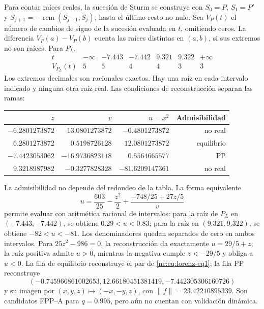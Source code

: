 Para contar raíces reales, la sucesión de Sturm se construye con
\(S_0=P\), \(S_1=P'\) y
\(S_{j+1}=-\operatorname{rem}(S_{j-1},S_j)\), hasta el último resto no
nulo. Sea \(V_P(t)\) el número de cambios de signo de la sucesión evaluada
en \(t\), omitiendo ceros. La diferencia \(V_P(a)-V_P(b)\) cuenta las
raíces distintas en \((a,b)\), si sus extremos no son raíces. Para \(P_L\),
\[
 \begin{array}{c|rrrrrr}
 t&-\infty&-7.443&-7.442&9.321&9.322&+\infty\\\hline
 V_{P_L}(t)&5&5&4&4&3&3
 \end{array}
\]
Los extremos decimales son racionales exactos. Hay una raíz en cada
intervalo indicado y ninguna otra raíz real. Las condiciones de
reconstrucción separan las ramas:
\begin{center}
\begin{tabular}{@{}rrrr@{}}
\toprule
\(z\) & \(v\) & \(u=x^2\) & Admisibilidad\\\midrule
\(-6.2801273872\) & \(13.0801273872\) & \(-0.4801273872\) & no real\\
\(6.2801273872\) & \(0.5198726128\) & \(12.0801273872\) & equilibrio\\
\(-7.4423053062\) & \(-16.9736823118\) & \(0.5564665577\) & PP\\
\(9.3218987982\) & \(-0.3277828328\) & \(-81.6209147361\) & no real\\
\bottomrule
\end{tabular}
\end{center}
La admisibilidad no depende del redondeo de la tabla. La forma equivalente
\begin{equation}
 u=\frac{603}{25}-\frac{z^2}{2}
   +\frac{-748/25+27z/5}{v}
 \label{eq:pp-lorenz-sign-certificate}
\end{equation}
permite evaluar con aritmética racional de intervalos: para la raíz de
\(P_L\) en \((-7.443,-7.442)\), se obtiene \(0.29<u<0.83\); para la
raíz en \((9.321,9.322)\), se obtiene \(-82<u<-81\).
Los denominadores quedan separados de cero en ambos intervalos.
Para \(25z^2-986=0\), la reconstrucción da exactamente \(u=29/5+z\);
la raíz positiva admite \(u>0\), mientras la negativa cumple
\(z<-29/5\) y obliga a \(u<0\).
La fila de equilibrio reconstruye el par de \cref{nc:eq:lorenz-eq1}; la
fila PP reconstruye
\begin{equation}
 (-0.745966861002653, 12.66180451381419, -7.442305306160726)
\end{equation}
y su imagen por \((x,y,z)\mapsto(-x,-y,z)\), con
\(\|f\|=23.42210895339\). Son candidatos FPP--A para \(q=0.995\), pero aún no
cuentan con validación dinámica.


